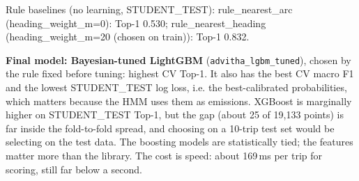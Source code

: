 \documentclass[11pt,a4paper]{article}
\begin{document}
\begin{table}[H]\centering\small
\caption{Cross-validation detail (TRAIN). Train$-$CV F1 is the over/underfitting evidence used in Section~3.2.}\label{tab:cv}
\end{table}

Rule baselines (no learning, STUDENT\_TEST): rule\_nearest\_arc (heading\_weight\_m=0): Top-1 0.530; rule\_nearest\_heading (heading\_weight\_m=20 (chosen on train)): Top-1 0.832.

\textbf{Final model: Bayesian-tuned LightGBM} (\texttt{advitha\_lgbm\_tuned}), chosen by the rule fixed before tuning: highest
CV Top-1. It also has the best CV macro F1 and the lowest STUDENT\_TEST log loss, i.e. the best-calibrated
probabilities, which matters because the HMM uses them as emissions. XGBoost is marginally higher on STUDENT\_TEST
Top-1, but the gap (about 25 of 19,133 points) is far inside the fold-to-fold spread, and choosing on a 10-trip test set
would be selecting on the test data. The boosting models are statistically tied; the features matter more than the
library. The cost is speed: about 169\,ms per trip for scoring, still far below a second.
\end{document}
